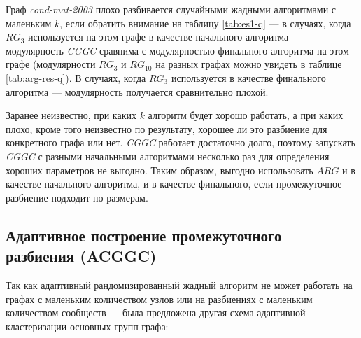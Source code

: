 Граф \emph{cond-mat-2003} плохо разбивается случайными жадными алгоритмами с маленьким $k$, если обратить внимание на таблицу \ref{tab:es1-q} --- в случаях, когда $RG_3$ используется на этом графе в качестве начального алгоритма --- модулярность \emph{CGGC} сравнима с модулярностью финального алгоритма на этом графе (модулярности $RG_3$ и $RG_{10}$ на разных графах можно увидеть в таблице \ref{tab:arg-res-q}). В случаях, когда $RG_3$ используется в качестве финального алгоритма --- модулярность получается сравнительно плохой.

Заранее неизвестно, при каких $k$ алгоритм будет хорошо работать, а при каких плохо, кроме того неизвестно по результату, хорошее ли это разбиение для конкретного графа или нет. \emph{CGGC} работает достаточно долго, поэтому запускать \emph{CGGC} с разными начальными алгоритмами несколько раз для определения хороших параметров не выгодно. Таким образом, выгодно использовать $ARG$ и в качестве начального алгоритма, и в качестве финального, если промежуточное разбиение подходит по размерам.



\subsection[Адаптивное построение промежуточного разбиения (ACGGC)]{Адаптивное построение промежуточного\\ разбиения (ACGGC)}
\label{subsec:es-adaptive}

Так как адаптивный рандомизированный жадный алгоритм не может работать на графах с маленьким количеством узлов или на разбиениях с маленьким количеством сообществ --- была предложена другая схема адаптивной кластеризации основных групп графа:

